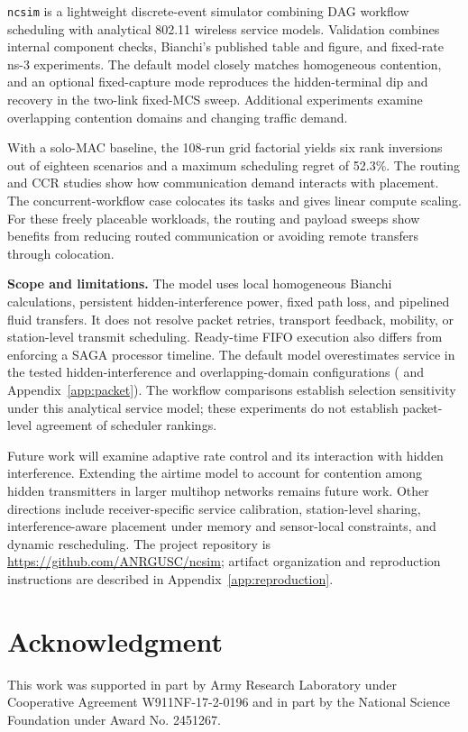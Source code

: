 \documentclass[conference]{IEEEtran}
\newcommand{\ncsim}{\texttt{ncsim}}
\begin{document}
\ncsim{} is a lightweight discrete-event simulator combining DAG workflow
scheduling with analytical 802.11 wireless service models. Validation
combines internal component checks, Bianchi's published table and figure,
and fixed-rate ns-3 experiments. The default model closely matches
homogeneous contention, and an optional fixed-capture mode reproduces the
hidden-terminal dip and recovery in the two-link fixed-MCS sweep.
Additional experiments examine overlapping contention domains and changing
traffic demand.

With a solo-MAC baseline, the 108-run
grid factorial yields six rank inversions out of eighteen scenarios
and a maximum scheduling regret of 52.3\%. The routing and CCR studies
show how communication demand interacts with placement.
The concurrent-workflow case colocates its tasks and gives
linear compute scaling.
For these freely placeable workloads, the routing and payload sweeps show
benefits from reducing routed communication or avoiding remote transfers
through colocation.

\textbf{Scope and limitations.} The model uses local homogeneous Bianchi
calculations, persistent hidden-interference power, fixed path loss, and
pipelined fluid transfers. It does not resolve packet retries, transport
feedback, mobility, or station-level transmit scheduling. Ready-time FIFO
execution also differs from enforcing a SAGA processor timeline.
The default model overestimates service in the tested hidden-interference
and overlapping-domain configurations ( and
Appendix~\ref{app:packet}). The workflow comparisons establish selection
sensitivity under this analytical service model; these experiments do not
establish packet-level agreement of scheduler rankings.

Future work will examine adaptive rate control and its interaction with
hidden interference. Extending the airtime model to account for contention
among hidden transmitters in larger multihop networks remains future work.
Other directions include receiver-specific service calibration, station-level
sharing, interference-aware placement under memory and sensor-local
constraints, and dynamic rescheduling. The project repository is
\url{https://github.com/ANRGUSC/ncsim}; artifact organization and reproduction
instructions are described in Appendix~\ref{app:reproduction}.

\section*{Acknowledgment}
This work was supported in part by Army Research Laboratory under Cooperative Agreement
W911NF-17-2-0196 and in part by the National Science Foundation under Award No. 2451267.
\end{document}
